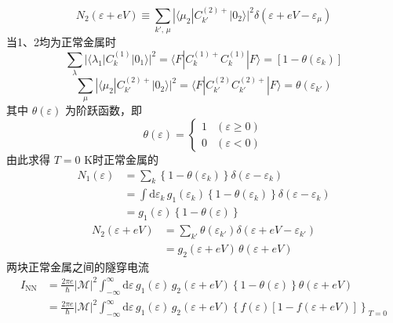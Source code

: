 \begin{equation}
  N_{2}(\varepsilon+eV)\equiv\sum_{k',\,\mu}
  |\langle\mu_{2}|C^{(2)+}_{k'}|0_{2}\rangle|^{2}
  \delta\left(\varepsilon+eV-\varepsilon_{\mu}\right)
\end{equation}
当1、2均为正常金属时
\begin{equation}
  \sum_{\lambda}|\langle\lambda_{1}|C^{(1)}_{k}|0_{1}\rangle|^{2}
  =\langle F|C^{(1)+}_{k}C^{(1)}_{k}|F\rangle
  =\left[1-\theta(\varepsilon_{k})\right]
\end{equation}
\begin{equation}
  \sum_{\mu}|\langle\mu_{2}|C^{(2)+}_{k'}|0_{2}\rangle|^{2}
  =\langle F|C^{(2)}_{k'}C^{(2)+}_{k'}|F\rangle
  =\theta(\varepsilon_{k'})
\end{equation}
其中 $\theta(\varepsilon)$ 为阶跃函数，即
\begin{equation}
  \theta(\varepsilon)=
  \begin{cases}1&(\varepsilon\geqslant0)\\0&(\varepsilon<0)\end{cases}
\end{equation}
由此求得 $T=0$ K时正常金属的
\begin{equation}
\begin{aligned}
  N_{1}(\varepsilon)&=\sum_{k}\left\{1-\theta(\varepsilon_{k})\right\}
  \delta\left(\varepsilon-\varepsilon_{k}\right)\\
  &=\int\mathrm{d}\varepsilon_{k}\,g_{1}(\varepsilon_{k})
  \left\{1-\theta(\varepsilon_{k})\right\}
  \delta\left(\varepsilon-\varepsilon_{k}\right)\\
  &=g_{1}(\varepsilon)\left\{1-\theta(\varepsilon)\right\}
\end{aligned}
\end{equation}
\begin{equation}
\begin{aligned}
  N_{2}(\varepsilon+eV)
  &=\sum_{k'}\theta\left(\varepsilon_{k'}\right)
  \delta\left(\varepsilon+eV-\varepsilon_{k'}\right)\\
  &=g_{2}(\varepsilon+eV)\,\theta(\varepsilon+eV)
\end{aligned}
\end{equation}
两块正常金属之间的隧穿电流
\begin{equation}
\begin{aligned}
  I_{\mathrm{NN}}&=\frac{2\pi e}{\hbar}|\mathscr{M}|^{2}
  \int_{-\infty}^{\infty}\mathrm{d}\varepsilon\,g_{1}(\varepsilon)\,
  g_{2}(\varepsilon+eV)\left\{1-\theta(\varepsilon)\right\}
  \theta\left(\varepsilon+eV\right)\\
  &=\frac{2\pi e}{\hbar}|\mathscr{M}|^{2}
  \int_{-\infty}^{\infty}\mathrm{d}\varepsilon\,g_{1}(\varepsilon)\,
  g_{2}(\varepsilon+eV)
  \left\{f(\varepsilon)\left[1-f(\varepsilon+eV)\right]\right\}_{T=0}
\end{aligned}
\end{equation}
